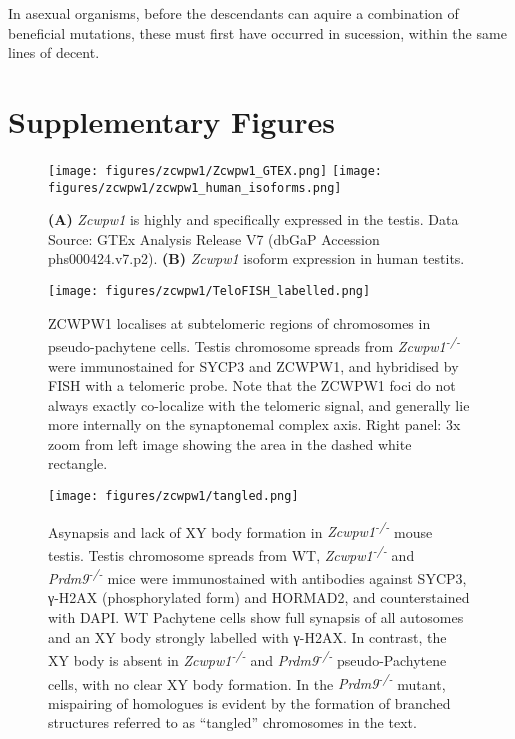 \begin{savequote}[8cm]
In asexual organisms, before the descendants can aquire a combination of beneficial mutations, these must first have occurred in sucession, within the same lines of decent.
\end{savequote}

\chapter{\label{app:1-A}Supplementary Figures}

\minitoc



\begin{figure}[H]
	\centering
	\texttt{[image: figures/zcwpw1/Zcwpw1\_GTEX.png]}
	\texttt{[image: figures/zcwpw1/zcwpw1\_human\_isoforms.png]}
	\caption[\textit{Zcwpw1} Tissue and Isoform expression]{
		\textbf{(A)} \textit{Zcwpw1} is highly and specifically expressed in the testis. Data Source: GTEx Analysis Release V7 (dbGaP Accession phs000424.v7.p2).
		\textbf{(B)} \textit{Zcwpw1} isoform expression in human testits.
	}
	\label{fig:isoforms}
\end{figure}


\begin{figure}[H]
	\centering
	\texttt{[image: figures/zcwpw1/TeloFISH\_labelled.png]}
	\caption[Telomeric Localisation]{
		ZCWPW1 localises at subtelomeric regions of chromosomes in pseudo-pachytene cells. Testis chromosome spreads from \textit{Zcwpw1\textsuperscript{-/-}} were immunostained for SYCP3 and ZCWPW1, and hybridised by FISH with a telomeric probe. Note that the ZCWPW1 foci do not always exactly co-localize with the telomeric signal, and generally lie more internally on the synaptonemal complex axis. Right panel: 3x zoom from left image showing the area in the dashed white rectangle.
	}
	\label{fig:telofish}
\end{figure}


\begin{figure}[H]
	\centering
	\texttt{[image: figures/zcwpw1/tangled.png]}
	\caption[Tangled Chromosome Phenotype]{
		Asynapsis and lack of XY body formation in \textit{Zcwpw1\textsuperscript{-/-}} mouse testis. Testis chromosome spreads from WT, \textit{Zcwpw1\textsuperscript{-/-}} and \textit{Prdm9\textsuperscript{-/-}} mice were immunostained with antibodies against SYCP3, γ-H2AX (phosphorylated form) and HORMAD2, and counterstained with DAPI. WT Pachytene cells show full synapsis of all autosomes and an XY body strongly labelled with γ-H2AX. In contrast, the XY body is absent in \textit{Zcwpw1\textsuperscript{-/-}} and \textit{Prdm9\textsuperscript{-/-}} pseudo-Pachytene cells, with no clear XY body formation. In the \textit{Prdm9\textsuperscript{-/-}} mutant, mispairing of homologues is evident by the formation of branched structures referred to as “tangled” chromosomes in the text.
	}
	\label{fig:tangled}
\end{figure}


